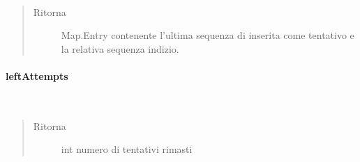 \documentclass[letterpaper,10pt,italian,openany,oneside]{sphinxmanual}
\begin{document}
\begin{fulllineitems}
\label{\detokenize{source/it/unicam/cs/pa/mastermind/gamecore/BoardModel:it.unicam.cs.pa.mastermind.gamecore.BoardModel.lastAttemptAndClue()}}~\begin{quote}\begin{description}
\item[{Ritorna}] \leavevmode
Map.Entry contenente l’ultima sequenza di  inserita come tentativo e la relativa sequenza indizio.

\end{description}\end{quote}

\end{fulllineitems}



\paragraph{leftAttempts}
\label{\detokenize{source/it/unicam/cs/pa/mastermind/gamecore/BoardModel:leftattempts}}

\begin{fulllineitems}
\label{\detokenize{source/it/unicam/cs/pa/mastermind/gamecore/BoardModel:it.unicam.cs.pa.mastermind.gamecore.BoardModel.leftAttempts()}}~\begin{quote}\begin{description}
\item[{Ritorna}] \leavevmode
int numero di tentativi rimasti

\end{description}\end{quote}

\end{fulllineitems}
\end{document}
